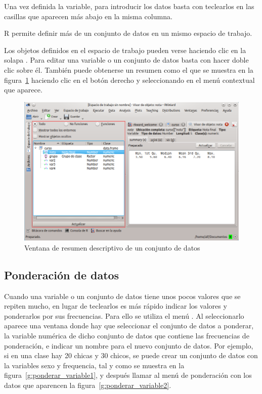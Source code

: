 Una vez definida la variable, para introducir los datos basta con teclearlos en las casillas que aparecen más abajo en
la misma columna.

R permite definir más de un conjunto de datos en un mismo espacio de trabajo.

Los objetos definidos en el espacio de trabajo pueden verse haciendo clic en la solapa .
Para editar una variable o un conjunto de datos basta con hacer doble clic sobre él.
También puede obtenerse un resumen como el que se muestra en la figura~\ref{g:resumen_datos} haciendo clic en el botón
derecho y seleccionando  en el menú contextual que aparece.

\begin{figure}[htp]
\begin{center}
  \includegraphics[scale=0.6]{capitulos/introduccion/img/resumen_datos}
  \caption{Ventana de resumen descriptivo de un conjunto de datos}
  \label{g:resumen_datos}
\end{center}
\end{figure}

\subsection{Ponderación de datos}
Cuando una variable o un conjunto de datos tiene unos pocos valores que se repiten mucho, en lugar de teclearlos es más
rápido indicar los valores y ponderarlos por sus frecuencias.
Para ello se utiliza el menú .
Al seleccionarlo aparece una ventana donde hay que seleccionar el conjunto de datos a ponderar, la variable numérica de
dicho conjunto de datos que contiene las frecuencias de ponderación, e indicar un nombre para el nuevo conjunto de datos.
Por ejemplo, si en una clase hay 20 chicas y 30 chicos, se puede crear un conjunto de datos con la variables sexo y
frequencia, tal y como se muestra en la figura~\ref{g:ponderar_variable1}, y después llamar al menú de ponderación con
los datos que aparencen la figura~\ref{g:ponderar_variable2}.


